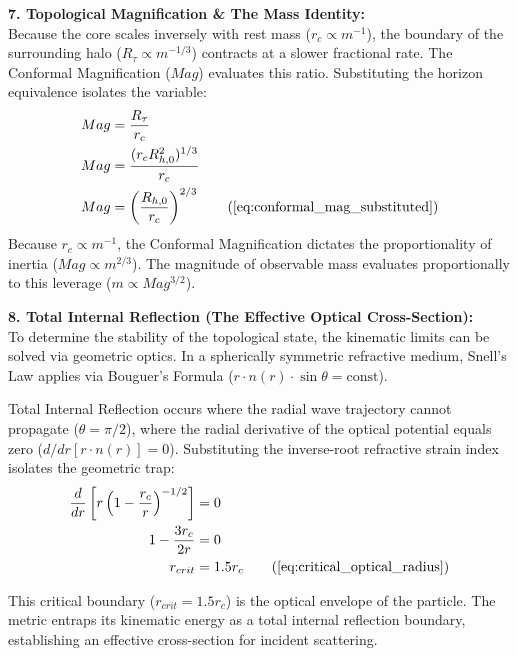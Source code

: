 \textbf{7. Topological Magnification \& The Mass Identity:} \\
Because the core scales inversely with rest mass ($r_c \propto m^{-1}$), the boundary of the surrounding halo ($R_\tau \propto m^{-1/3}$) contracts at a slower fractional rate. The Conformal Magnification ($Mag$) evaluates this ratio. Substituting the horizon equivalence isolates the variable:
\begin{align}
    Mag &= \frac{R_\tau}{r_c} \nonumber \\
    Mag &= \frac{(r_c R_{h,0}^2)^{1/3}}{r_c} \nonumber \\
    Mag &= \left( \frac{R_{h,0}}{r_c} \right)^{2/3} \tag{\ref{eq:conformal_mag_substituted}}
\end{align}
Because $r_c \propto m^{-1}$, the Conformal Magnification dictates the proportionality of inertia ($Mag \propto m^{2/3}$). The magnitude of observable mass evaluates proportionally to this leverage ($m \propto Mag^{3/2}$). 

\vspace{0.2 cm}

\textbf{8. Total Internal Reflection (The Effective Optical Cross-Section):} \\
To determine the stability of the topological state, the kinematic limits can be solved via geometric optics. In a spherically symmetric refractive medium, Snell's Law applies via Bouguer's Formula ($r \cdot n(r) \cdot \sin \theta = \text{const}$). 

Total Internal Reflection occurs where the radial wave trajectory cannot propagate ($\theta = \pi/2$), where the radial derivative of the optical potential equals zero ($d/dr [r \cdot n(r)] = 0$). Substituting the inverse-root refractive strain index isolates the geometric trap: 
\begin{align}
    \frac{d}{dr} \left[ r \left( 1 - \frac{r_c}{r} \right)^{-1/2} \right] &= 0 \nonumber \\
    1 - \frac{3r_c}{2r} &= 0 \nonumber \\
    r_{crit} &= 1.5 r_c \tag{\ref{eq:critical_optical_radius}}
\end{align}

This critical boundary ($r_{crit} = 1.5 r_c$) is the optical envelope of the particle. The metric entraps its kinematic energy as a total internal reflection boundary, establishing an effective cross-section for incident scattering. 

\vspace{0.2 cm}


